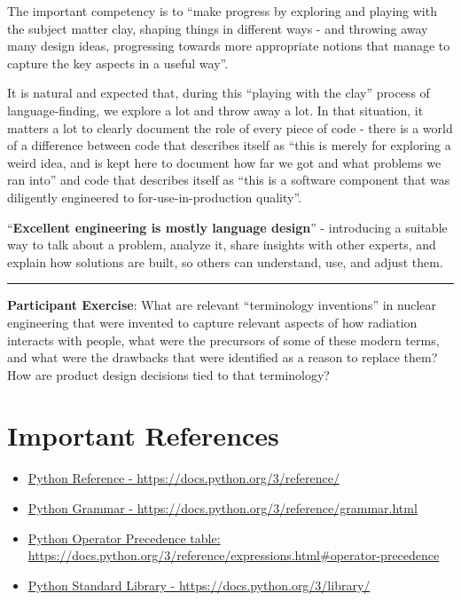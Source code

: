 \documentclass[11pt]{article}
\providecommand{\tightlist}{%
      \setlength{\itemsep}{0pt}\setlength{\parskip}{0pt}}
\begin{document}
The important competency is to ``make progress by exploring and playing
with the subject matter clay, shaping things in different ways - and
throwing away many design ideas, progressing towards more appropriate
notions that manage to capture the key aspects in a useful way''.

It is natural and expected that, during this ``playing with the clay''
process of language-finding, we explore a lot and throw away a lot. In
that situation, it matters a lot to clearly document the role of every
piece of code - there is a world of a difference between code that
describes itself as ``this is merely for exploring a weird idea, and is
kept here to document how far we got and what problems we ran into'' and
code that describes itself as ``this is a software component that was
diligently engineered to for-use-in-production quality''.

``\textbf{Excellent engineering is mostly language design}'' -
introducing a suitable way to talk about a problem, analyze it, share
insights with other experts, and explain how solutions are built, so
others can understand, use, and adjust them.

\begin{center}\rule{0.5\linewidth}{0.5pt}\end{center}

\textbf{Participant Exercise}: What are relevant ``terminology
inventions'' in nuclear engineering that were invented to capture
relevant aspects of how radiation interacts with people, what were the
precursors of some of these modern terms, and what were the drawbacks
that were identified as a reason to replace them? How are product design
decisions tied to that terminology?

    \hypertarget{important-references}{%
\section{Important References}\label{important-references}}

\begin{itemize}
\tightlist
\item
  \href{https://docs.python.org/3/reference/}{Python Reference -
  https://docs.python.org/3/reference/}
\item
  \href{https://docs.python.org/3/reference/grammar.html}{Python Grammar
  - https://docs.python.org/3/reference/grammar.html}
\item
  \href{https://docs.python.org/3/reference/expressions.html\#operator-precedence}{Python
  Operator Precedence table:
  https://docs.python.org/3/reference/expressions.html\#operator-precedence}
\item
  \href{https://docs.python.org/3/library/}{Python Standard Library -
  https://docs.python.org/3/library/}
\end{itemize}
\end{document}
